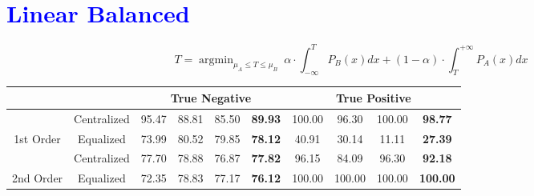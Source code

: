 \documentclass[10pt,a4paper]{article}
\begin{document}
	\section{\textcolor{blue}{Linear Balanced}}
		$$T = \mathop{\arg\min}_{\mu_A \le T \le \mu_B}\ \alpha \cdot \int_{-\infty}^{T}P_B(x)dx + (1 - \alpha) \cdot \int_{T}^{+\infty}P_A(x)dx$$
		\begin{table}[!h]
			\centering
			\begin{tabular}{|c|c|c|c|c|c|c|c|c|c|}
				\hline
				&             & \multicolumn{4}{c|}{True Negative}                            & \multicolumn{4}{c|}{True Positive}                                \\ \hline
				& Centralized & 95.47 & 88.81 & 85.50 & {\color[HTML]{FE0000} \textbf{89.93}} & 100.00 & 96.30  & 100.00 & {\color[HTML]{FE0000} \textbf{98.77}}  \\ \cline{2-10} 
				\multirow{-2}{*}{1st Order} & Equalized   & 73.99 & 80.52 & 79.85 & {\color[HTML]{FE0000} \textbf{78.12}} & 40.91  & 30.14  & 11.11  & {\color[HTML]{FE0000} \textbf{27.39}}  \\ \hline
				& Centralized & 77.70 & 78.88 & 76.87 & {\color[HTML]{FE0000} \textbf{77.82}} & 96.15  & 84.09  & 96.30  & {\color[HTML]{FE0000} \textbf{92.18}}  \\ \cline{2-10} 
				\multirow{-2}{*}{2nd Order} & Equalized   & 72.35 & 78.83 & 77.17 & {\color[HTML]{FE0000} \textbf{76.12}} & 100.00 & 100.00 & 100.00 & {\color[HTML]{FE0000} \textbf{100.00}} \\ \hline
			\end{tabular}
		\end{table}
	
\end{document}
